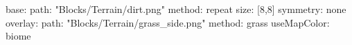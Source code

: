 base:
  path: "Blocks/Terrain/dirt.png"
  method: repeat
  size: [8,8]
  symmetry: none
overlay:
  path: "Blocks/Terrain/grass_side.png"
  method: grass
  useMapColor: biome